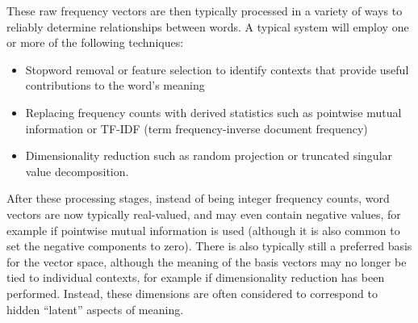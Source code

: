 \documentclass[journal]{IEEEtran}
\theoremstyle{definition}
\begin{document}
These raw frequency vectors are then typically processed in a variety
of ways to reliably determine relationships between words. A typical
system will employ one or more of the following techniques:
\begin{itemize}
\item Stopword removal or feature selection to identify contexts that
  provide useful contributions to the word's meaning
\item Replacing frequency counts with derived statistics such as
  pointwise mutual information or TF-IDF (term frequency-inverse
  document frequency)
\item Dimensionality reduction such as random projection or truncated
  singular value decomposition.
\end{itemize}
After these processing stages, instead of being integer frequency
counts, word vectors are now typically real-valued, and may even
contain negative values, for example if pointwise mutual information
is used (although it is also common to set the negative components to
zero). There is also typically still a preferred basis for the vector
space, although the meaning of the basis vectors may no longer be tied
to individual contexts, for example if dimensionality reduction has
been performed. Instead, these dimensions are often considered to
correspond to hidden ``latent'' aspects of meaning.
\end{document}
